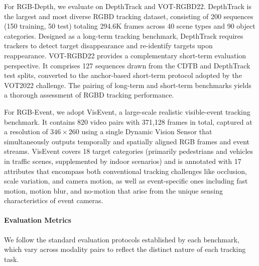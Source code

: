For RGB-Depth, we evaluate on DepthTrack\cite{depthtrack} and VOT-RGBD22\cite{vot2022}. DepthTrack is the largest and most diverse RGBD tracking dataset, consisting of 200 sequences (150 training, 50 test) totaling 294.6K frames across 40 scene types and 90 object categories. Designed as a long-term tracking benchmark, DepthTrack requires trackers to detect target disappearance and re-identify targets upon reappearance. VOT-RGBD22 provides a complementary short-term evaluation perspective. It comprises 127 sequences drawn from the CDTB\cite{lukezic2019cdtb} and DepthTrack test splits, converted to the anchor-based short-term protocol adopted by the VOT2022 challenge. The pairing of long-term and short-term benchmarks yields a thorough assessment of RGBD tracking performance.
    
For RGB-Event, we adopt VisEvent\cite{wang2023visevent}, a large-scale realistic visible-event tracking benchmark. It contains 820 video pairs with 371,128 frames in total, captured at a resolution of $346 \times 260$ using a single Dynamic Vision Sensor that simultaneously outputs temporally and spatially aligned RGB frames and event streams. VisEvent covers 18 target categories (primarily pedestrians and vehicles in traffic scenes, supplemented by indoor scenarios) and is annotated with 17 attributes that encompass both conventional tracking challenges like occlusion, scale variation, and camera motion, as well as event-specific ones including fast motion, motion blur, and no-motion that arise from the unique sensing characteristics of event cameras.

\paragraph*{Evaluation Metrics}
We follow the standard evaluation protocols established by each benchmark, which vary across modality pairs to reflect the distinct nature of each tracking task.

